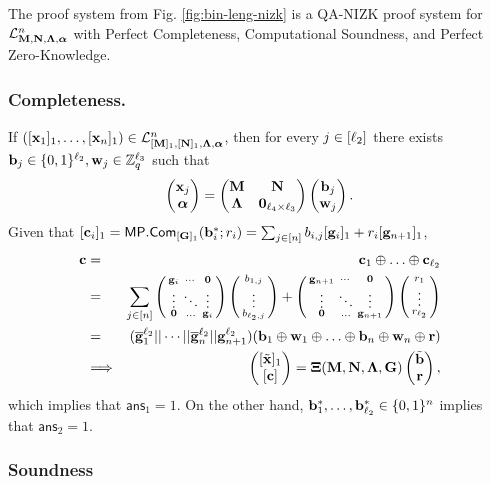 \begin{theorem}
The proof system from Fig. \ref{fig:bin-leng-nizk} is a QA-NIZK proof system for $\mathcal{L}_{\mathbf{{M}},\mathbf{{N}},\mathbf{{\Lambda}},{\boldsymbol \alpha}}^n$ with Perfect Completeness, Computational Soundness, and Perfect Zero-Knowledge.
\end{theorem}


\subsubsection{Completeness.} If $([\mathbf{x}_1]_1,\ldots,
[\mathbf{{x}}_n]_1) \in\mathcal{L}_{[\mathbf{{M}}]_1,[\mathbf{{N}}]_1,\mathbf{{\Lambda}},{\boldsymbol \alpha}}^n$, then for every $j\in[{\ell_2}]$ there exists $\mathbf{{b}}_j\in\{0,1\}^{{\ell_2}},\mathbf{{w}}_j \in\mathbb{Z}_q^{{\ell_3}}$ such that 
$$
\left(\begin{matrix}
\mathbf{{x}}_j\\
{\boldsymbol \alpha}
\end{matrix}\right)
=
\begin{pmatrix}
\mathbf{{M}}       & \mathbf{{N}}\\
\mathbf{{\Lambda}} & \mathbf{{0}}_{{\ell_4}\times {\ell_3}}
\end{pmatrix}
\left(\begin{matrix}
    \mathbf{{b}}_j\\
    \mathbf{{w}}_j
\end{matrix}\right).
$$
Given that $[\mathbf{{c}}_i]_1 = \mathsf{MP}.\mathsf{Com}_{[\mathbf{{G}}]_1}(\mathbf{b}_i^*;r_i)=\sum_{j\in[n]}b_{i,j}[\mathbf{g}_i]_1+r_i[\mathbf{g}_{n+1}]_1$,
\begin{eqnarray*}
\vecb{c} & = & \vecb{c}_1\oplus\ldots\oplus\vecb{c}_\lb\\
         & = & {\sum_{j\in[n]}\sdmatrix{\vecb{g}_i}\smallpmatrix{b_{1,j}\\\vdots\\b_{\lb,j}}+\sdmatrix{\vecb{g}_{n+1}}\smallpmatrix{r_1\\\vdots\\r_\lb}}\\
         & = & (\overline{\vecb{g}}_1^\lb||\cdots||\overline{\vecb{g}}_{n}^\lb||\vecb{g}_{n+1}^\lb)(\vecb{b}_1\oplus\vecb{w}_1\oplus\ldots\oplus\vecb{b}_n\oplus\vecb{w}_n\oplus\vecb{r}) \\
& \Longrightarrow &
\pmatri{[\tvecb{x}]_1 \\  [\vecb{c}]} = \matr{\Xi}(\matr{M},\matr{N},\matr{\Lambda},\matr{G}) \pmatri{\tvecb{b}\\ \vecb{r}},
\end{eqnarray*}
which implies that $\mathsf{ans}_1=1$. On the other hand, $\mathbf{b}_1^*,\ldots,\mathbf{b}_{\ell_2}^*\in\{0,1\}^n$ implies that $\mathsf{ans}_2=1$.
  
\subsubsection{Soundness}

